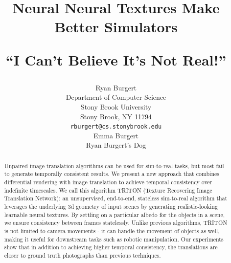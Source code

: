 \documentclass{article}
\title{Neural Neural Textures Make Better Simulators

``I Can't Believe It's Not Real!''%
 }
\author{%
	Ryan Burgert \\
	Department of Computer Science\\
	Stony Brook University\\
	Stony Brook, NY 11794 \\
	\texttt{rburgert@cs.stonybrook.edu} \\
	\And
	Emma Burgert \\
	Ryan Burgert's Dog\\
}
\begin{document}
\maketitle


\begin{abstract}


	Unpaired image translation algorithms can be used for sim-to-real tasks, but most fail to generate temporally consistent results.
	We present a new approach that combines differential rendering with image translation to achieve temporal consistency over indefinite timescales.
%
	We call this algorithm TRITON (Texture Recovering Image Translation Network): an unsupervised, end-to-end, stateless sim-to-real algorithm that 
	leverages the underlying 3d geometry of input scenes by generating realistic-looking learnable neural textures.
%
	By settling on a particular albedo for the objects in a scene, we ensure consistency between frames statelessly.
	Unlike previous algorithms, TRITON is not limited to camera movements - it can handle the movement of objects as well, making it useful for downstream tasks such as robotic manipulation.
	Our experiments show that in addition to achieving higher temporal consistency, the translations are closer to ground truth photographs than previous techniques.

\end{abstract}

\end{document}
